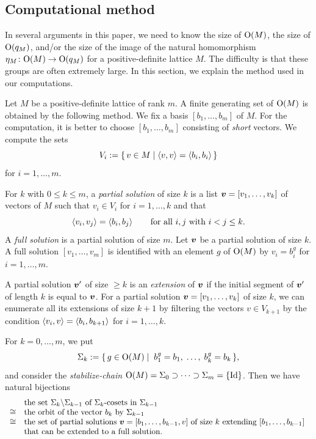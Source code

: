 \documentclass{amsart} %
\begin{document}
\subsection{Computational method}\label{subsec:computational}
%
In several arguments in this paper, 
we need to know the size of $\mathord{\mathrm{O}}(M)$,
the size of $\mathord{\mathrm{O}}(q_M)$, and/or 
the size of the image of the natural homomorphism
$\eta_M\colon \mathord{\mathrm{O}}(M) \to \mathord{\mathrm{O}}(q_M)$
for a positive-definite lattice $M$.
The difficulty is that these groups  are often extremely large.
In this section, we explain the method used in our computations.
%
\par
%
Let $M$ be a positive-definite lattice of rank $m$.
A finite generating set  of $\mathord{\mathrm{O}}(M)$ is obtained by the following method.
We fix a basis $[b_1, \dots, b_m]$ of $M$.
For the computation,
 it is better to choose $[b_1, \dots, b_m]$
 consisting of \emph{short}  vectors.
 We compute the sets 
\[
V_i:=\{\,{v\in M}\mid {\langle v, v \rangle=\langle b_i, b_i \rangle} \,\}
\]
for $i=1, \dots, m$.
%
\begin{definition}\label{def:solutions}
For $k$ with $0\le k\le m$,
a \emph{partial solution} of size $k$  is  a list 
$\boldsymbol{v}=[v_1, \dots, v_k]$ of vectors of $M$ 
such that $v_i\in V_i$ for $i=1, \dots, k$ and that 
\[
\langle v_i, v_j \rangle=\langle b_i, b_j \rangle\;\;\quad\;\;\textrm{for all $i, j$ with $i<j\le k$.}
\]
A \emph{full solution} is a partial solution of size $m$.
Let $\boldsymbol{v}$ be a partial solution of size $k$.
A full solution $[v_1, \dots, v_m]$  is identified with an element $g$ 
of $\mathord{\mathrm{O}}(M)$ by $v_i=b_i^g$ for $ i=1, \dots, m$.
\par
A partial solution  $\boldsymbol{v}^{\prime}$ of size $\ge k$ is
an \emph{extension}  of $\boldsymbol{v}$ 
if the initial segment of $\boldsymbol{v}^{\prime}$ of length $k$ is equal to $\boldsymbol{v}$.
For a partial solution  $\boldsymbol{v}=[v_1, \dots, v_k]$ of size $k$,
we can enumerate all its extensions of size $k+1$ by filtering the vectors  $v\in V_{k+1}$
by the condition $\langle v_i, v \rangle=\langle b_i, b_{k+1} \rangle$ for $i=1, \dots, k$.
\end{definition}
%
%
%
For $k=0, \dots, m$, 
we put
\[
\Sigma_k:=\{\,{g\in \mathord{\mathrm{O}}(M)}\mid {\;b_1^g=b_1, \;\dots, \; b_k^g=b_k} \,\},
\]
and consider the \emph{stabilize-chain} 
$\mathord{\mathrm{O}}(M)=\Sigma_0\supset \dots\supset \Sigma_m=\{\mathord{\mathrm{Id}}\}$.
Then we have natural bijections
\[
\begin{array}{cl}
&\textrm{the set $\Sigma_{k}\backslash\Sigma_{k-1}$ of $\Sigma_{k}$-cosets in $\Sigma_{k-1}$}\\
\cong &\textrm{the orbit  of the vector $b_k$ by $\Sigma_{k-1}$ }\\
\cong &\textrm{the set of  partial solutions $\boldsymbol{v}=[b_1, \dots, b_{k-1}, v]$ of size $k$  
 extending $[b_1, \dots, b_{k-1}]$ }\\
&\textrm{that can be extended to  a full solution.}
\end{array}
\]
\end{document}
